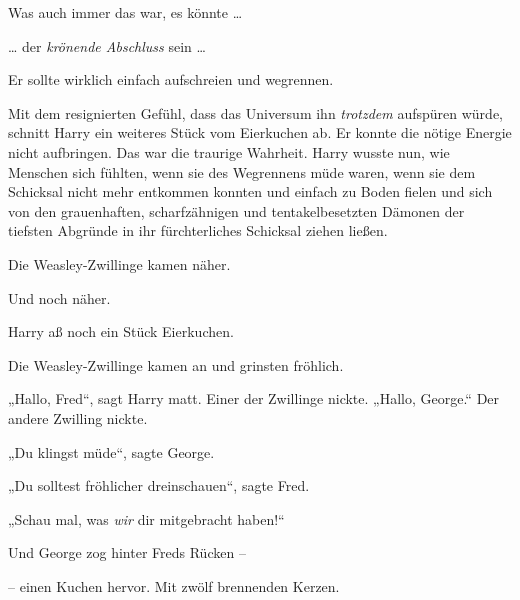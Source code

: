 Was auch immer das war, es könnte …

… der \emph{krönende Abschluss} sein …

Er sollte wirklich einfach aufschreien und wegrennen.

Mit dem resignierten Gefühl, dass das Universum ihn \emph{trotzdem} aufspüren würde, schnitt Harry ein weiteres Stück vom Eierkuchen ab. Er konnte die nötige Energie nicht aufbringen. Das war die traurige Wahrheit. Harry wusste nun, wie Menschen sich fühlten, wenn sie des Wegrennens müde waren, wenn sie dem Schicksal nicht mehr entkommen konnten und einfach zu Boden fielen und sich von den grauenhaften, scharfzähnigen und tentakelbesetzten Dämonen der tiefsten Abgründe in ihr fürchterliches Schicksal ziehen ließen.

Die Weasley-Zwillinge kamen näher.

Und noch näher.

Harry aß noch ein Stück Eierkuchen.

Die Weasley-Zwillinge kamen an und grinsten fröhlich.

„Hallo, Fred“, sagt Harry matt. Einer der Zwillinge nickte. „Hallo, George.“ Der andere Zwilling nickte.

„Du klingst müde“, sagte George.

„Du solltest fröhlicher dreinschauen“, sagte Fred.

„Schau mal, was \emph{wir} dir mitgebracht haben!“

Und George zog hinter Freds Rücken –

– einen Kuchen hervor. Mit zwölf brennenden Kerzen.

